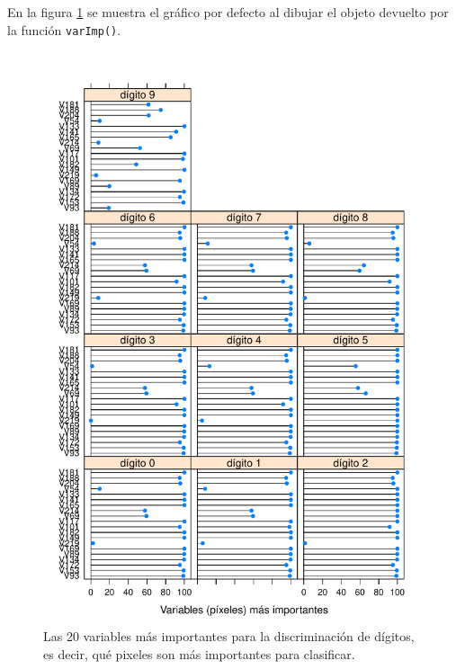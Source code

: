 \documentclass[12pt,spanish,a4paper]{article}
\newenvironment{Shaded}{\begin{snugshade}}{\end{snugshade}}
\newcommand{\KeywordTok}[1]{\textcolor[rgb]{0.13,0.29,0.53}{\textbf{#1}}}
\newcommand{\DataTypeTok}[1]{\textcolor[rgb]{0.13,0.29,0.53}{#1}}
\newcommand{\DecValTok}[1]{\textcolor[rgb]{0.00,0.00,0.81}{#1}}
\newcommand{\StringTok}[1]{\textcolor[rgb]{0.31,0.60,0.02}{#1}}
\newcommand{\OperatorTok}[1]{\textcolor[rgb]{0.81,0.36,0.00}{\textbf{#1}}}
\newcommand{\NormalTok}[1]{#1}
\numberwithin{equation}{section}
\begin{document}
En la figura \ref{fig:varimp_modelo_1_modelo_svmlinear2_paso1} se
muestra el gráfico por defecto al dibujar el objeto devuelto por la
función \texttt{varImp()}.

\begin{Shaded}
\end{Shaded}

\begin{figure}[h]

{\centering \includegraphics[width=0.8\linewidth]{graphics/svm/varimp_modelo_1_modelo_svmlinear2_paso1-1} 

}

\caption{Las 20 variables más importantes para la discriminación de dígitos, es decir, qué pixeles son más importantes para clasificar.}\label{fig:varimp_modelo_1_modelo_svmlinear2_paso1}
\end{figure}
\end{document}
